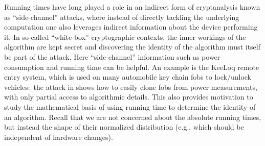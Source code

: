 \documentclass{llncs}
\newcommand{\secref}[1]{Section~\ref{#1}}
\numberwithin{equation}{section}
\renewcommand\({\left(}
\renewcommand\){\right)}
\begin{document}
Running times have long played a role in an indirect form of cryptanalysis known as ``side-channel'' attacks, where instead of directly tackling the underlying computation one also leverages   indirect information about the device   performing it.
In so-called ``white-box'' cryptographic contexts,   the inner workings of the algorithm are kept secret and
 discovering the identity of the algorithm must itself be part of the attack.  Here  ``side-channel'' information such as  power consumption and running time  can be helpful.  An example is   the {\sc KeeLoq} remote   entry system, which is used on many automobile key chain fobs to lock/unlock vehicles:~the attack in \cite{keeloq} shows how to easily clone  fobs from power measurements, with only partial access to algorithmic details.   This also provides    motivation to study the mathematical basis of using running time   to determine the identity of an algorithm.
  Recall that we are not concerned about the absolute running times, but instead the shape of their normalized distribution (e.g., which should be independent of hardware changes).
%
%
\end{document}
